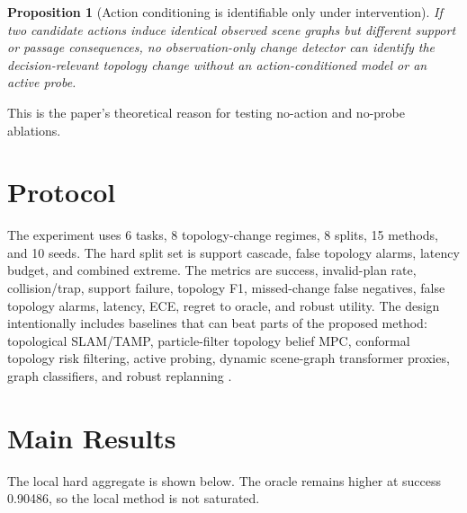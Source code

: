 \documentclass{article}
\newtheorem{proposition}{Proposition}
\begin{document}
\begin{proposition}[Action conditioning is identifiable only under intervention]
If two candidate actions induce identical observed scene graphs but different support or passage consequences, no observation-only change detector can identify the decision-relevant topology change without an action-conditioned model or an active probe.
\end{proposition}
\noindent This is the paper's theoretical reason for testing no-action and no-probe ablations.

\section{Protocol}
The experiment uses 6 tasks, 8 topology-change regimes, 8 splits, 15 methods, and 10 seeds. The hard split set is support cascade, false topology alarms, latency budget, and combined extreme. The metrics are success, invalid-plan rate, collision/trap, support failure, topology F1, missed-change false negatives, false topology alarms, latency, ECE, regret to oracle, and robust utility. The design intentionally includes baselines that can beat parts of the proposed method: topological SLAM/TAMP, particle-filter topology belief MPC, conformal topology risk filtering, active probing, dynamic scene-graph transformer proxies, graph classifiers, and robust replanning \citep{chughtai2023object15,martinson2026integrating16,park2025visual17,ryde2011alignment18,riel2019improved19,chartounyndmultimodel20,wang2024contrastive21,engelbracht2024spotlight22,balasingam2025graph23}.

\section{Main Results}
The local hard aggregate is shown below. The oracle remains higher at success 0.90486, so the local method is not saturated.
\end{document}
